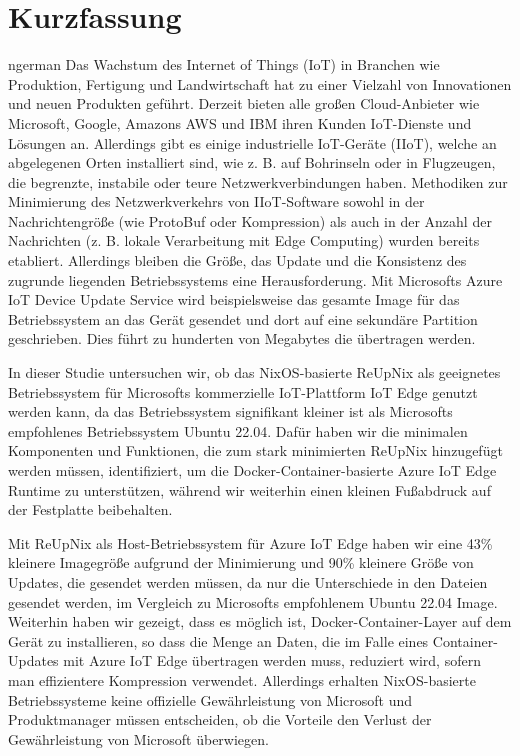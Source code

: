 \chapter*{Kurzfassung}
\begin{otherlanguage*}{ngerman}
Das Wachstum des Internet of Things (IoT) in Branchen wie Produktion, Fertigung
und Landwirtschaft hat zu einer Vielzahl von Innovationen und neuen Produkten geführt.
Derzeit bieten alle großen Cloud-Anbieter wie Microsoft, Google, Amazons AWS und IBM
ihren Kunden IoT-Dienste und Lösungen an.
Allerdings gibt es einige industrielle IoT-Geräte (IIoT), welche
 an abgelegenen Orten installiert sind, wie z. B. auf Bohrinseln oder in Flugzeugen,
die begrenzte, instabile oder teure Netzwerkverbindungen haben.
Methodiken zur Minimierung des Netzwerkverkehrs von IIoT-Software sowohl in der
Nachrichtengröße (wie ProtoBuf oder  Kompression) als auch in der Anzahl der Nachrichten
(z. B. lokale Verarbeitung mit Edge Computing) wurden bereits etabliert.
Allerdings bleiben die Größe, das Update und die Konsistenz des zugrunde liegenden
Betriebssystems eine Herausforderung. Mit Microsofts Azure IoT Device Update Service
wird beispielsweise das gesamte Image für das Betriebssystem an das Gerät gesendet
und dort auf eine sekundäre Partition geschrieben. Dies führt zu hunderten von Megabytes
die übertragen werden.

In dieser Studie untersuchen wir, ob das NixOS-basierte ReUpNix als geeignetes
Betriebssystem für Microsofts kommerzielle IoT-Plattform
IoT Edge genutzt werden kann, da das Betriebssystem signifikant kleiner ist als Microsofts empfohlenes
Betriebssystem Ubuntu 22.04. Dafür haben wir die minimalen Komponenten und Funktionen,
die zum stark minimierten ReUpNix hinzugefügt werden müssen, identifiziert, um die
Docker-Container-basierte Azure IoT Edge Runtime zu unterstützen, während wir
weiterhin einen kleinen Fußabdruck auf der Festplatte beibehalten.

Mit ReUpNix als Host-Betriebssystem für Azure IoT Edge haben wir eine 43\%
kleinere Imagegröße aufgrund der Minimierung und 90\% kleinere Größe von
Updates, die gesendet werden müssen, da nur die Unterschiede in den Dateien gesendet
werden, im Vergleich zu Microsofts empfohlenem Ubuntu 22.04 Image. Weiterhin haben
wir gezeigt, dass es möglich ist, Docker-Container-Layer auf dem Gerät zu installieren,
so dass die Menge an Daten, die im Falle eines Container-Updates mit Azure IoT Edge
übertragen werden muss, reduziert wird, sofern man effizientere Kompression verwendet.
 Allerdings erhalten NixOS-basierte
Betriebssysteme keine offizielle Gewährleistung von Microsoft und Produktmanager
müssen entscheiden, ob die Vorteile den Verlust der Gewährleistung von Microsoft überwiegen.

\end{otherlanguage*}
